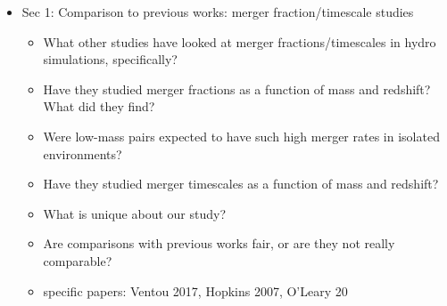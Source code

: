 \documentclass[twocolumn,linenumbers]{aastex631}
\begin{document}
    \begin{itemize}
        \item Sec 1: Comparison to previous works: merger fraction/timescale studies
        \begin{itemize} 
            \item What other studies have looked at merger fractions/timescales in hydro simulations, specifically? 
            \item Have they studied merger fractions as a function of mass and redshift? What did they find?
            \item Were low-mass pairs expected to have such high merger rates in isolated environments? 
            \item Have they studied merger timescales as a function of mass and redshift? 
            \item What is unique about our study?
            \item Are comparisons with previous works fair, or are they not really comparable?
            \item specific papers: Ventou 2017, Hopkins 2007, O'Leary 20
        \end{itemize}


\end{itemize}
\end{document}
